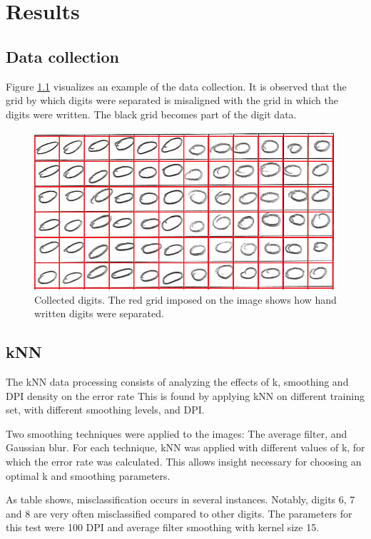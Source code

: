 \chapter{Results}
\section{Data collection}

Figure \ref{fig:misalignment} visualizes an example of the data collection.
It is observed that the grid by which digits were separated is misaligned with the grid
in which the digits were written. The black grid becomes part of the digit data.
\begin{figure}[H]
\centering
\includegraphics[width  =\textwidth]{figure/kiddi-01-grid-nosmooth-300dpi_cut.png}
\caption{Collected digits. The red grid imposed on the image shows how hand written digits were separated.}
\label{fig:misalignment}
\end{figure}

\section{kNN}
The kNN data processing consists of analyzing the effects of k, smoothing and
DPI density on the error rate  This is found by applying kNN on different training set,
with different smoothing levels, and DPI.

Two smoothing techniques were applied to the images: The average filter, and Gaussian blur.  
For each technique, kNN was applied with different values of k, for which the error rate was calculated.
This allows insight necessary for choosing an optimal k and smoothing parameters.

%
As table
shows, misclassification occurs in several instances.
Notably, digits 6, 7 and 8 are very often misclassified compared to other digits.
The parameters for this test were 100 DPI and average filter smoothing with kernel size 15.

